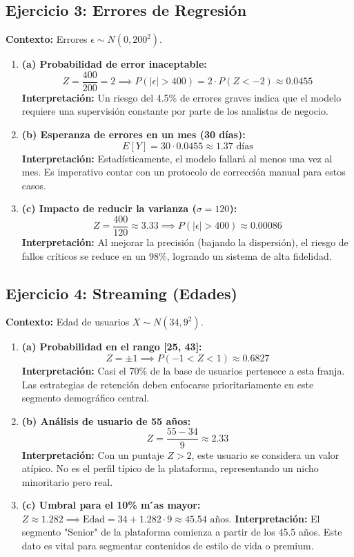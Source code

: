 \documentclass[a4paper,12pt]{article}
\begin{document}
\subsection{Ejercicio 3: Errores de Regresión}
\textbf{Contexto:} Errores $\epsilon \sim N(0, 200^2)$.

\begin{enumerate}
    \item \textbf{(a) Probabilidad de error inaceptable:}
    \[ Z = \frac{400}{200} = 2 \implies P(|\epsilon| > 400) = 2 \cdot P(Z < -2) \approx 0.0455 \]
    \textcolor{interpretationcolor}{\textbf{Interpretación:} Un riesgo del 4.5\% de errores graves indica que el modelo requiere una supervisión constante por parte de los analistas de negocio.}

    \item \textbf{(b) Esperanza de errores en un mes (30 días):}
    \[ E[Y] = 30 \cdot 0.0455 \approx 1.37 \text{ días} \]
    \textcolor{interpretationcolor}{\textbf{Interpretación:} Estadísticamente, el modelo fallará al menos una vez al mes. Es imperativo contar con un protocolo de corrección manual para estos casos.}

    \item \textbf{(c) Impacto de reducir la varianza ($\sigma = 120$):}
    \[ Z = \frac{400}{120} \approx 3.33 \implies P(|\epsilon| > 400) \approx 0.00086 \]
    \textcolor{interpretationcolor}{\textbf{Interpretación:} Al mejorar la precisión (bajando la dispersión), el riesgo de fallos críticos se reduce en un 98\%, logrando un sistema de alta fidelidad.}
\end{enumerate}

\subsection{Ejercicio 4: Streaming (Edades)}
\textbf{Contexto:} Edad de usuarios $X \sim N(34, 9^2)$.

\begin{enumerate}
    \item \textbf{(a) Probabilidad en el rango [25, 43]:}
    \[ Z = \pm 1 \implies P(-1 < Z < 1) \approx 0.6827 \]
    \textcolor{interpretationcolor}{\textbf{Interpretación:} Casi el 70\% de la base de usuarios pertenece a esta franja. Las estrategias de retención deben enfocarse prioritariamente en este segmento demográfico central.}

    \item \textbf{(b) Análisis de usuario de 55 años:}
    \[ Z = \frac{55 - 34}{9} \approx 2.33 \]
    \textcolor{interpretationcolor}{\textbf{Interpretación:} Con un puntaje $Z > 2$, este usuario se considera un valor atípico. No es el perfil típico de la plataforma, representando un nicho minoritario pero real.}

    \item \textbf{(c) Umbral para el 10\% m ́as mayor:}
    $Z \approx 1.282 \implies \text{Edad} = 34 + 1.282 \cdot 9 \approx 45.54 \text{ años}$.
    \textcolor{interpretationcolor}{\textbf{Interpretación:} El segmento "Senior" de la plataforma comienza a partir de los 45.5 años. Este dato es vital para segmentar contenidos de estilo de vida o premium.}
\end{enumerate}
\end{document}
